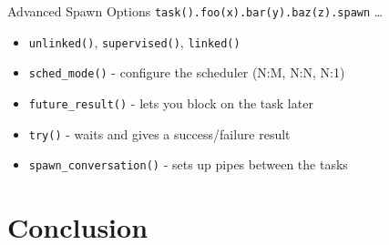 \documentclass[xcolor=dvipsnames]{beamer}
\begin{document}
\begin{frame}{Advanced Spawn Options}
	\texttt{task().foo(x).bar(y).baz(z).spawn} \dots
	\linegap
	\begin{itemize}
		\item \texttt{unlinked()}, \texttt{supervised()}, \texttt{linked()}
		\item \texttt{sched\_mode()} - configure the scheduler (N:M, N:N, N:1)
		\item \texttt{future\_result()} - lets you block on the task later
		\item \texttt{try()} - waits and gives a success/failure result
		\item \texttt{spawn\_conversation()} - sets up pipes between the tasks
	\end{itemize}
\end{frame}
\section{Conclusion}

\end{document}
